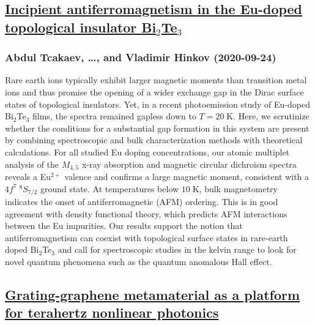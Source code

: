 \subsection*{\href{http://arxiv.org/abs/2009.11733v1}{Incipient antiferromagnetism in the Eu-doped topological insulator  Bi$_2$Te$_3$}}
\subsubsection*{Abdul Tcakaev, \dots, and Vladimir Hinkov (2020-09-24)}
Rare earth ions typically exhibit larger magnetic moments than transition
metal ions and thus promise the opening of a wider exchange gap in the Dirac
surface states of topological insulators. Yet, in a recent photoemission study
of Eu-doped Bi$_2$Te$_3$ films, the spectra remained gapless down to $T =
20\;\text{K}$. Here, we scrutinize whether the conditions for a substantial gap
formation in this system are present by combining spectroscopic and bulk
characterization methods with theoretical calculations. For all studied Eu
doping concentrations, our atomic multiplet analysis of the $M_{4,5}$ x-ray
absorption and magnetic circular dichroism spectra reveals a Eu$^{2+}$ valence
and confirms a large magnetic moment, consistent with a $4f^7 \; {^8}S_{7/2}$
ground state. At temperatures below $10\;\text{K}$, bulk magnetometry indicates
the onset of antiferromagnetic (AFM) ordering. This is in good agreement with
density functional theory, which predicts AFM interactions between the Eu
impurities. Our results support the notion that antiferromagnetism can coexist
with topological surface states in rare-earth doped Bi$_2$Te$_3$ and call for
spectroscopic studies in the kelvin range to look for novel quantum phenomena
such as the quantum anomalous Hall effect.

\subsection*{\href{http://arxiv.org/abs/2009.11730v1}{Grating-graphene metamaterial as a platform for terahertz nonlinear  photonics}}
